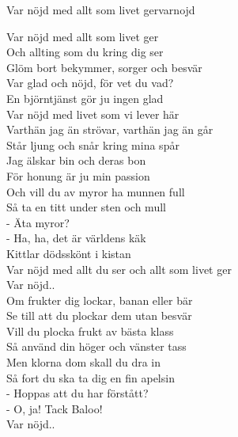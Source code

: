 \begin{song}{Var nöjd med allt som livet ger}{varnojd}
\begin{vers}
Var nöjd med allt som livet ger\\
Och allting som du kring dig ser\\
Glöm bort bekymmer, sorger och besvär\\
Var glad och nöjd, för vet du vad?\\
En björntjänst gör ju ingen glad\\
Var nöjd med livet som vi lever här\\
Varthän jag än strövar, varthän jag än går\\
Står ljung och snår kring mina spår\\
Jag älskar bin och deras bon\\
För honung är ju min passion\\
Och vill du av myror ha munnen full\\
Så ta en titt under sten och mull\\
- Äta myror?\\
- Ha, ha, det är världens käk\\
Kittlar dödsskönt i kistan\\
Var nöjd med allt du ser och allt som livet ger\\
Var nöjd..\\
Om frukter dig lockar, banan eller bär\\
Se till att du plockar dem utan besvär\\
Vill du plocka frukt av bästa klass\\
Så använd din höger och vänster tass\\
Men klorna dom skall du dra in\\
Så fort du ska ta dig en fin apelsin\\
- Hoppas att du har förstått?\\
- O, ja! Tack Baloo!\\
Var nöjd..\\
\end{vers}
\end{song}
